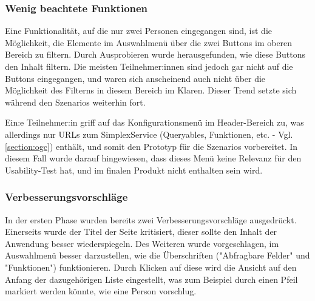 \subsubsection{Wenig beachtete Funktionen}

Eine Funktionalität, auf die nur zwei Personen eingegangen sind, ist die Möglichkeit, die Elemente im Auswahlmenü über die zwei Buttons im oberen Bereich zu filtern. Durch Ausprobieren wurde herausgefunden, wie diese Buttons den Inhalt filtern. Die meisten Teilnehmer:innen sind jedoch gar nicht auf die Buttons eingegangen, und waren sich anscheinend auch nicht über die Möglichkeit des Filterns in diesem Bereich im Klaren. Dieser Trend setzte sich während den Szenarios weiterhin fort.

Ein:e Teilnehmer:in griff auf das Konfigurationsmenü im Header-Bereich zu, was allerdings nur \acsp{URL} zum SimplexService (Queryables, Funktionen, etc. - Vgl. \ref{section:ogc}) enthält, und somit den Prototyp für die Szenarios vorbereitet. In diesem Fall wurde darauf hingewiesen, dass dieses Menü keine Relevanz für den Usability-Test hat, und im finalen Produkt nicht enthalten sein wird.

\subsubsection{Verbesserungsvorschläge}

In der ersten Phase wurden bereits zwei Verbesserungsvorschläge ausgedrückt. Einerseits wurde der Titel der Seite kritisiert, dieser sollte den Inhalt der Anwendung besser wiederspiegeln. Des Weiteren wurde vorgeschlagen, im Auswahlmenü besser darzustellen, wie die Überschriften ("Abfragbare Felder" und "Funktionen") funktionieren. Durch Klicken auf diese wird die Ansicht auf den Anfang der dazugehörigen Liste eingestellt, was zum Beispiel durch einen Pfeil markiert werden könnte, wie eine Person vorschlug.
